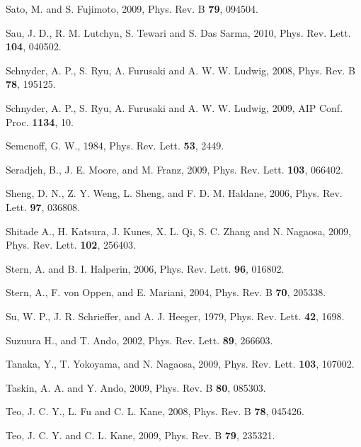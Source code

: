 \documentclass[twocolumn,floatfix,showpacs,rmp,aps]{revtex4}
\begin{document}
\begin{thebibliography}{99}
Sato, M. and S. Fujimoto, 2009,
Phys. Rev. B {\bf 79}, 094504.

Sau, J. D., R. M. Lutchyn, S. Tewari and S. Das Sarma, 2010,
Phys. Rev. Lett. {\bf 104}, 040502.

Schnyder, A. P., S. Ryu, A. Furusaki and A. W. W. Ludwig, 2008,
Phys. Rev. B {\bf 78}, 195125.

Schnyder, A. P., S. Ryu, A. Furusaki and A. W. W. Ludwig, 2009,
AIP Conf. Proc. {\bf 1134}, 10.

Semenoff, G. W., 1984,
Phys. Rev. Lett. {\bf 53}, 2449.

Seradjeh, B., J. E. Moore, and M. Franz, 2009,
Phys. Rev. Lett. {\bf 103}, 066402.

Sheng, D. N., Z. Y. Weng, L. Sheng, and F. D. M. Haldane, 2006,
Phys. Rev. Lett. {\bf 97}, 036808.

Shitade A., H. Katsura, J. Kunes, X. L. Qi, S. C. Zhang and N. Nagaosa, 2009,
Phys. Rev. Lett. {\bf 102}, 256403.

Stern, A. and B. I. Halperin, 2006,
Phys. Rev. Lett. {\bf 96}, 016802.

Stern, A., F. von Oppen, and E. Mariani, 2004,
Phys. Rev. B {\bf 70}, 205338.

Su, W. P., J. R. Schrieffer, and A. J. Heeger, 1979,
Phys. Rev. Lett. {\bf 42}, 1698.

Suzuura H., and T. Ando, 2002,
Phys. Rev. Lett. {\bf 89}, 266603.

Tanaka, Y., T. Yokoyama, and N. Nagaosa, 2009,
Phys. Rev. Lett. {\bf 103}, 107002.

Taskin, A. A. and Y. Ando, 2009,
Phys. Rev. B {\bf 80}, 085303.

Teo, J. C. Y., L. Fu and C. L. Kane, 2008,
Phys. Rev. B {\bf 78}, 045426.

Teo, J. C. Y. and C. L. Kane, 2009,
Phys. Rev. B {\bf 79}, 235321.


\end{thebibliography}
\end{document}
